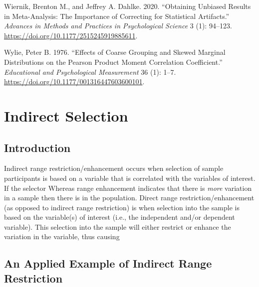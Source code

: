 \documentclass[
  letterpaper,
  DIV=11,
  numbers=noendperiod]{scrreprt}
\newlength{\cslhangindent}
\newlength{\cslentryspacingunit} %
\newenvironment{CSLReferences}[2] %
 {%
  \setlength{\parindent}{0pt}
  \ifodd #1
  \let\oldpar\par
  \def\par{\hangindent=\cslhangindent\oldpar}
  \fi
  \setlength{\parskip}{#2\cslentryspacingunit}
 }%
 {}
\begin{document}
\begin{CSLReferences}{1}{0}
\leavevmode{}%
Wiernik, Brenton M., and Jeffrey A. Dahlke. 2020. {``Obtaining Unbiased
Results in Meta-Analysis: The Importance of Correcting for Statistical
Artifacts.''} \emph{Advances in Methods and Practices in Psychological
Science} 3 (1): 94--123. \url{https://doi.org/10.1177/2515245919885611}.

\leavevmode{}%
Wylie, Peter B. 1976. {``Effects of Coarse Grouping and Skewed Marginal
Distributions on the Pearson Product Moment Correlation Coefficient.''}
\emph{Educational and Psychological Measurement} 36 (1): 1--7.
\url{https://doi.org/10.1177/001316447603600101}.

\end{CSLReferences}

\hypertarget{indirect-selection}{%
\chapter{Indirect Selection}\label{indirect-selection}}

\hypertarget{introduction-6}{%
\section{Introduction}\label{introduction-6}}

Indirect range restriction/enhancement occurs when selection of sample
participants is based on a variable that is correlated with the
variables of interest. If the selector Whereas range enhancement
indicates that there is \emph{more} variation in a sample then there is
in the population. Direct range restriction/enhancement (as opposed to
indirect range restriction) is when selection into the sample is based
on the variable(s) of interest (i.e., the independent and/or dependent
variable). This selection into the sample will either restrict or
enhance the variation in the variable, thus causing

\hypertarget{an-applied-example-of-indirect-range-restriction}{%
\section{An Applied Example of Indirect Range
Restriction}\label{an-applied-example-of-indirect-range-restriction}}
\end{document}
